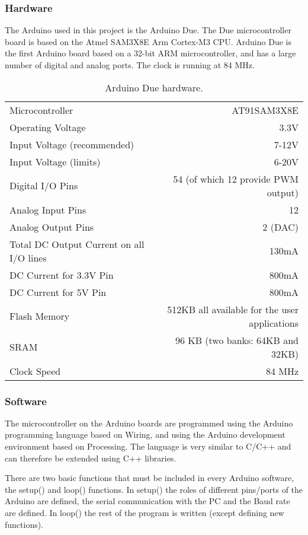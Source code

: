 \subsubsection{Hardware}
The Arduino used in this project is the Arduino Due. The Due microcontroller board is 
based on the Atmel SAM3X8E Arm Cortex-M3 CPU. Arduino Due is the first Arduino board 
based on a 32-bit ARM microcontroller, and has a large number of digital and analog ports. 
The clock is running at 84 MHz.
\begin{table}
	\caption{Arduino Due hardware.}
	\begin{tabular}{l | r}

		Microcontroller 							&	AT91SAM3X8E \\
		Operating Voltage 							&	3.3V \\
		Input Voltage (recommended)					&	7-12V \\
		Input Voltage (limits)						&	6-20V \\
		Digital I/O Pins 							&	54 (of which 12 provide PWM output) \\
		Analog Input Pins 							&	12 \\
		Analog Output Pins 							&	2 (DAC) \\
		Total DC Output Current on all I/O lines 	&	130mA \\
		DC Current for 3.3V Pin 					&	800mA \\
		DC Current for 5V Pin 						&	800mA \\
		Flash Memory 								&	512KB all available for the user 														applications\\
		SRAM										&	96 KB (two banks: 64KB and 32KB) \\
		Clock Speed 								&	84 MHz \\

	\end{tabular}
\end{table}

\newpage
\subsubsection{Software}
The microcontroller on the Arduino boards are programmed using the Arduino programming 
language based on Wiring, and using the Arduino development environment based on Processing.
The language is very similar to C/C++ and can therefore be extended using C++ libraries.

There are two basic functions that must be included in every Arduino software, 
the setup() and loop() functions. In setup() the roles of different pins/ports of the Arduino 
are defined, the serial communication with the PC and the Baud rate are defined. In loop() 
the rest of the program is written (except defining new functions).

